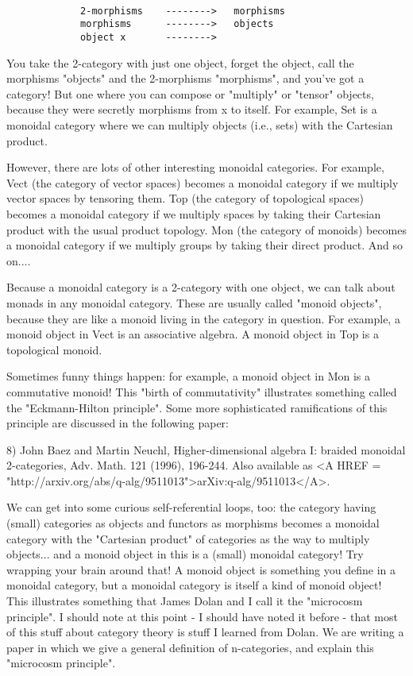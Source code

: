 \begin{verbatim}

             2-morphisms    -------->   morphisms
             morphisms      -------->   objects
             object x       -------->   

\end{verbatim}
    

You take the 2-category with just one object, forget the object, call
the morphisms "objects" and the 2-morphisms
"morphisms", and you've got a category!  But one where you can
compose or "multiply" or "tensor" objects, because
they were secretly morphisms from x to itself.  For example, Set is a
monoidal category where we can multiply objects (i.e., sets) with the
Cartesian product.

However, there are lots of other interesting monoidal categories.  For
example, Vect (the category of vector spaces) becomes a monoidal
category if we multiply vector spaces by tensoring them.  Top (the
category of topological spaces) becomes a monoidal category if we
multiply spaces by taking their Cartesian product with the usual product
topology.    Mon (the category of monoids) becomes a monoidal category if
we multiply groups by taking their direct product.   And so on....

Because a monoidal category is a 2-category with one object, we can talk
about monads in any monoidal category.  These are usually called 
"monoid objects", because they are like a monoid living in the category
in question.  For example, a monoid object in Vect is an associative
algebra.  A monoid object in Top is a topological monoid.   

Sometimes funny things happen: for example, a monoid object in Mon is a
commutative monoid!  This "birth of commutativity" illustrates something
called the "Eckmann-Hilton principle".  Some more sophisticated
ramifications of this principle are discussed in the following paper:

8) John Baez and Martin Neuchl, Higher-dimensional algebra I: braided
monoidal 2-categories, Adv. Math. 121 (1996), 196-244.  Also
available as 
<A HREF = "http://arxiv.org/abs/q-alg/9511013">arXiv:q-alg/9511013</A>. 

We can get into some curious self-referential loops, too: the category
having (small) categories as objects and functors as morphisms
becomes a monoidal category with the "Cartesian product" of categories as
the way to multiply objects... and a monoid object in this is a (small)
monoidal category!  Try wrapping your brain around that!  A monoid
object is something you define in a monoidal category, but a monoidal
category is itself a kind of monoid object!  This illustrates something
that James Dolan and I call it the "microcosm principle".  I should note
at this point - I should have noted it before - that most of this
stuff about category theory is stuff I learned from Dolan.  We are
writing a paper in which we give a general definition of n-categories,
and explain this "microcosm principle".

